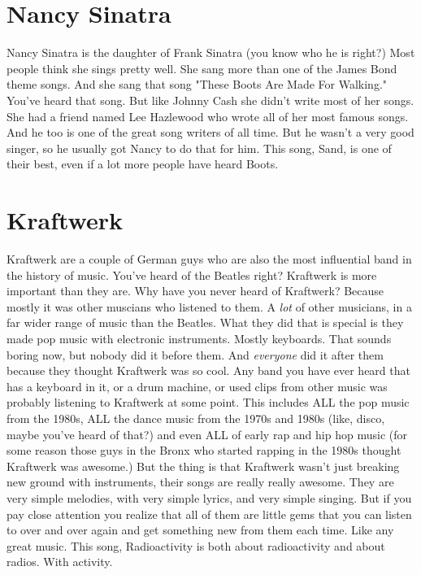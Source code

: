 \documentclass[letterpaper,12pt,single]{article}
\begin{document}
\section{Nancy Sinatra}

Nancy Sinatra is the daughter of Frank Sinatra (you know who he is right?) Most people think she sings pretty well. She sang more than one of the James Bond theme songs. And she sang that song "These Boots Are Made For Walking." You've heard that song. But like Johnny Cash she didn't write most of her songs. She had a friend named Lee Hazlewood who wrote all of her most famous songs. And he too is one of the great song writers of all time. But he wasn't a very good singer, so he usually got Nancy to do that for him. This song, Sand, is one of their best, even if a lot more people have heard Boots.

\section{Kraftwerk}

Kraftwerk are a couple of German guys who are also the most influential band in the history of music. You've heard of the Beatles right? Kraftwerk is more important than they are. Why have you never heard of Kraftwerk? Because mostly it was other muscians who listened to them. A \emph{lot} of other musicians, in a far wider range of music than the Beatles. What they did that is special is they made pop music with electronic instruments. Mostly keyboards. That sounds boring now, but nobody did it before them. And \emph{everyone} did it after them because they thought Kraftwerk was so cool. Any band you have ever heard that has a keyboard in it, or a drum machine, or used clips from other music was probably listening to Kraftwerk at some point. This includes ALL the pop music from the 1980s, ALL the dance music from the 1970s and 1980s (like, disco, maybe you've heard of that?) and even ALL of early rap and hip hop music (for some reason those guys in the Bronx who started rapping in the 1980s thought Kraftwerk was awesome.) But the thing is that Kraftwerk wasn't just breaking new ground with instruments, their songs are really really awesome. They are very simple melodies, with very simple lyrics, and very simple singing. But if you pay close attention you realize that all of them are little gems that you can listen to over and over again and get something new from them each time. Like any great music. This song, Radioactivity is both about radioactivity and about radios. With activity.
\end{document}
